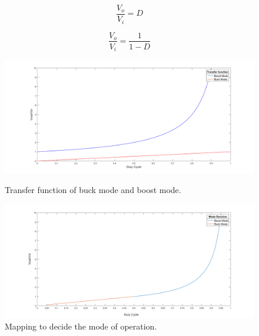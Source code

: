 \vspace{1cm}
\begin{minipage}{0.3\linewidth}
	\begin{equation}
	\frac{V_o}{V_i} = D
	\end{equation}
	\label{tfbuck}
\end{minipage}%
\begin{minipage}{0.5\linewidth}
	\begin{equation}
	\frac{V_o}{V_i}= \frac{1}{1-D}
	\end{equation}
	\label{tfboost}
\end{minipage}

\begin{figure}[H]
	\begin{minipage}[b]{0.9\linewidth}
		\centering
		\includegraphics[width=\textwidth]{../Pictures/transfer_function_buck_boost_mode}
		\caption{Transfer function of buck mode and boost mode.}
		\label{fig:tfmodes}
	\end{minipage}
	\hspace{0.5cm}
	\begin{minipage}[b]{0.9\linewidth}
		\centering
		\includegraphics[width=\textwidth]{../Pictures/Mode_decision_duty_vs_gain}
		\caption{Mapping to decide the mode of operation.}
		\label{fig:modedecisionmapping}
	\end{minipage}
\end{figure}

